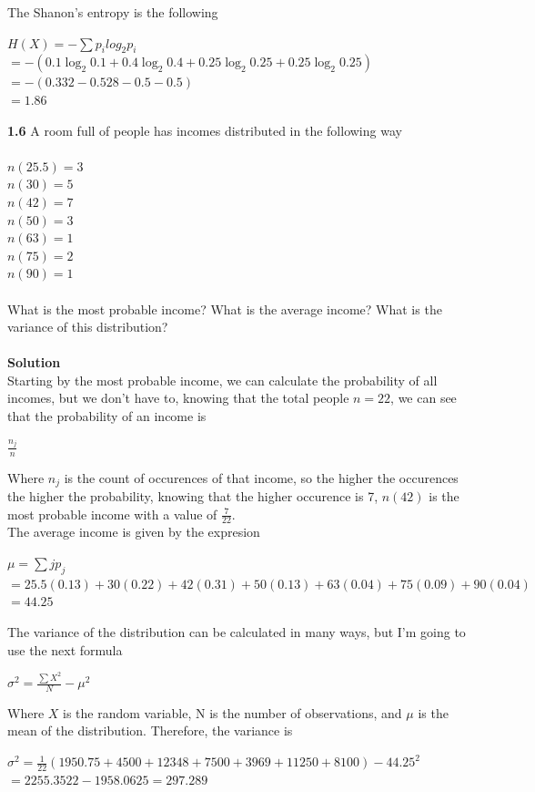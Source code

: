 \documentclass{article}
\begin{document}
The Shanon's entropy is the following\\
\begin{center}
$H(X) = - \sum p_i log_2 p_i$\\
$= -(0.1 \log_2 0.1 + 0.4 \log_2 0.4 + 0.25 \log_2 0.25 + 0.25 \log_2 0.25)$
$= -(0.332 - 0.528 - 0.5 - 0.5)$\\
$= 1.86$
\end{center}
\textbf{1.6} A room full of people has incomes distributed in the following way\\ \\
$n(25.5) = 3$\\
$n(30) = 5$\\
$n(42) = 7$\\
$n(50) = 3$\\
$n(63) = 1$\\
$n(75) = 2$\\
$n(90) = 1$\\ \\
What is the most probable income? What is the average income? What is the variance of this distribution?\\ \\
\textbf{Solution}\\
Starting by the most probable income, we can calculate the probability of all incomes, but we don't  have to, knowing that the total people $n = 22$, we can see that the probability of an income is\\
\begin{center}
$\frac{n_j}{n}$
\end{center}
Where $n_j$ is the count of occurences of that income, so the higher the occurences the higher the probability, knowing that the higher occurence is 7, $n(42)$ is the most probable income with a value of $\frac{7}{22}$.\\
The average income is given by the expresion \\
\begin{center}
$\mu = \sum j p_j$\\
$= 25.5(0.13) + 30(0.22) + 42(0.31) + 50(0.13) + 63(0.04) + 75(0.09) + 90(0.04)$\\
$= 44.25$
\end{center}
The variance of the distribution can be calculated in many ways, but I'm going to use the next formula\\
\begin{center}
$\sigma^2 = \frac{\sum X^2}{N} - \mu^2$
\end{center}
Where $X$ is the random variable, N is the number of observations, and $\mu$ is the mean of the distribution. Therefore, the variance  is\\
\begin{center}
$\sigma^2 = \frac{1}{22}(1950.75 + 4500 + 12348 + 7500 + 3969 + 11250 + 8100) - 44.25^2$\\
$= 2255.3522 - 1958.0625 = 297.289$
\end{center}



\printindex
\end{document}
